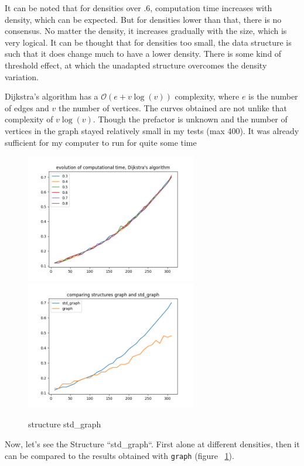 \documentclass{article}
\begin{document}
It can be noted that for densities over .6, computation time increases with density, which can be expected. But for densities lower than that, there is no consensus. No matter the density, it increases gradually with the size, which is very logical. It can be thought that for densities too small, the data structure is such that it does change much to have a lower density. There is some kind of threshold effect, at which the unadapted structure overcomes the density variation.

Dijkstra's algorithm has a $\mathcal O(e+v\log(v))$ complexity, where $e$ is the number of edges and $v$ the number of vertices. The curves obtained are not unlike that complexity of $v\log(v)$. Though the prefactor is unknown and the number of vertices in the graph stayed relatively small in my tests (max 400). It was already sufficient for my computer to run for quite some time

\begin{figure}[!h]
	\centering
	\includegraphics[width=7.5cm]{ressources/dijkstra_density_std_graph.png}
	\includegraphics[width=7.5cm]{ressources/comparing_graph__std_graph.png}
	\caption{structure std\_graph}
	\label{fig:stdgraph}
\end{figure}

Now, let's see the Structure ``std\_graph``. First alone at different densities, then it can be compared to the results obtained with \texttt{graph} (figure ~\ref{fig:stdgraph}).
\end{document}
